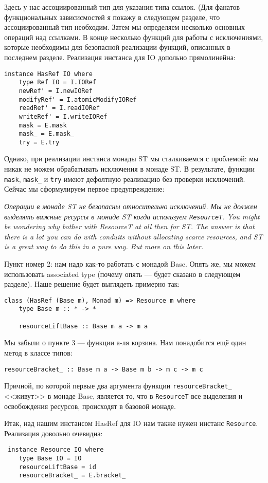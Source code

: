 Здесь у нас ассоциированный тип для указания типа ссылок. (Для фанатов функциональных зависисмостей я покажу в следующем разделе, что ассоциированный тип необходим. 
Затем мы определяем несколько основных операций над ссылками.
В конце несколько функций для работы с
исключениями, которые необходимы для безопасной реализации функций, описанных в
последнем разделе. Реализация инстанса для IO допольно прямолинейна:
  
\begin{lstlisting}
instance HasRef IO where
    type Ref IO = I.IORef
    newRef' = I.newIORef
    modifyRef' = I.atomicModifyIORef
    readRef' = I.readIORef
    writeRef' = I.writeIORef
    mask = E.mask
    mask_ = E.mask_
    try = E.try 
\end{lstlisting}
Однако, при реализации инстанса монады ST мы сталкиваемся с проблемой: мы никак не можем
обрабатывать исключения в монаде ST. В результате, функции \lstinline'mask',
\lstinline'mask_' и \lstinline'try' имеют
дефолтную реализацию без проверки исключений. Сейчас мы сформулируем первое
предупреждение:

\textit{Операции в монаде ST не безопасны относительно исключений. Мы не должен выделять
важные ресурсы в монаде ST когда используем \lstinline'ResourceT'. You might be wondering
why bother
with
ResourceT at all then for ST. The answer is that there is a
lot you can do with conduits without allocating scarce resources, and ST is a
great way to do this in a pure way. But more on this later. }


Пункт номер 2: нам надо как-то работать с монадой Base. Опять же, мы можем
использовать associated type (почему опять --- будет сказано в следующем разделе). 
Наше решение будет выглядеть примерно так:
\begin{lstlisting}
class (HasRef (Base m), Monad m) => Resource m where
    type Base m :: * -> *

    resourceLiftBase :: Base m a -> m a 
\end{lstlisting}
Мы забыли о пункте 3 --- функции а-ля корзина. Нам понадобится ещё один метод в классе
типов:
\begin{lstlisting}
resourceBracket_ :: Base m a -> Base m b -> m c -> m c 
\end{lstlisting}
Причной, по которой первые два аргумента функции \lstinline'resourceBracket_' <<живут>> в
монаде Base, является то, что в \lstinline'ResourceT' все выделения и освобождения
ресурсов, происходят в базовой монаде.

Итак, над нашим инстансом HasRef для IO нам также нужен инстанс
\lstinline'Resource'. Реализация довольно очевидна:
\begin{lstlisting}
 instance Resource IO where
    type Base IO = IO
    resourceLiftBase = id
    resourceBracket_ = E.bracket_
\end{lstlisting}

